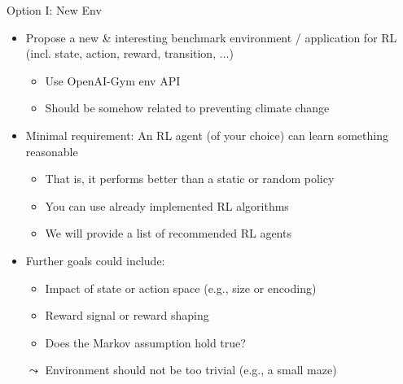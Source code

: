 \documentclass[aspectratio=169]{../latex_main/tntbeamer}  %
\begin{document}
\begin{frame}[c]{Option I: New Env}
	
	\begin{itemize}
		\item Propose a new \& interesting benchmark environment / application for RL (incl. state, action, reward, transition, $\ldots$)
		\begin{itemize}
			\item Use OpenAI-Gym env API
			\item Should be somehow related to preventing climate change
		\end{itemize}
		\item Minimal requirement: An RL agent (of your choice) can learn something reasonable
		\begin{itemize}
			\item That is, it performs better than a static or random policy
			\item You can use already implemented RL algorithms
			\item We will provide a list of recommended RL agents
		\end{itemize}
		\item Further goals could include:
		\begin{itemize}
			\item Impact of state or action space (e.g., size or encoding)
			\item Reward signal or reward shaping
			\item Does the Markov assumption hold true?
		\end{itemize}
		\item[$\leadsto$] Environment should not be too trivial (e.g., a small maze)
	\end{itemize}
	
\end{frame}
\end{document}
